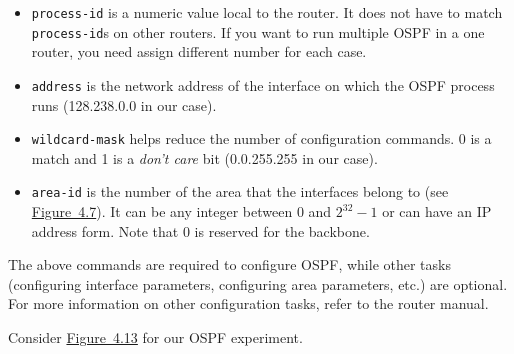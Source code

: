\documentclass{../UTNetLab}
\begin{document}
    \begin{itemize}
        \item \lstinline{process-id} is a numeric value local to the router.
        It does not have to match \lstinline{process-id}s on other routers.
        If you want to run multiple OSPF in a one router, you need assign different number for each case.

        \item \lstinline{address} is the network address of the interface on which the OSPF process runs (128.238.0.0 in our case).

        \item \lstinline{wildcard-mask} helps reduce the number of configuration commands.
        0 is a match and 1 is a \textit{don’t care} bit (0.0.255.255 in our case).
        
        \item \lstinline{area-id} is the number of the area that the interfaces belong to (see \hyperref[fig:4.7]{Figure~4.7}).
        It can be any integer between 0 and $2^{32} - 1$ or can have an IP address form.
        Note that 0 is reserved for the backbone.
\end{itemize}
 
    The above commands are required to configure OSPF, while other tasks (configuring interface parameters, configuring area parameters, etc.) are optional.
    For more information on other configuration tasks, refer to the router manual.

    Consider \hyperref[fig:4.13]{Figure~4.13} for our OSPF experiment.
\end{document}

